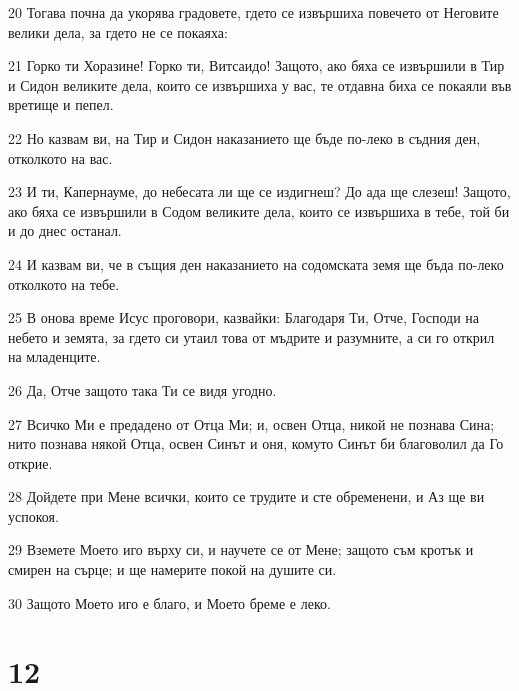 \par 20 Тогава почна да укорява градовете, гдето се извършиха повечето от Неговите велики дела, за гдето не се покаяха:
\par 21 Горко ти Хоразине! Горко ти, Витсаидо! Защото, ако бяха се извършили в Тир и Сидон великите дела, които се извършиха у вас, те отдавна биха се покаяли във вретище и пепел.
\par 22 Но казвам ви, на Тир и Сидон наказанието ще бъде по-леко в съдния ден, отколкото на вас.
\par 23 И ти, Капернауме, до небесата ли ще се издигнеш? До ада ще слезеш! Защото, ако бяха се извършили в Содом великите дела, които се извършиха в тебе, той би и до днес останал.
\par 24 И казвам ви, че в същия ден наказанието на содомската земя ще бъда по-леко отколкото на тебе.
\par 25 В онова време Исус проговори, казвайки: Благодаря Ти, Отче, Господи на небето и земята, за гдето си утаил това от мъдрите и разумните, а си го открил на младенците.
\par 26 Да, Отче защото така Ти се видя угодно.
\par 27 Всичко Ми е предадено от Отца Ми; и, освен Отца, никой не познава Сина; нито познава някой Отца, освен Синът и оня, комуто Синът би благоволил да Го открие.
\par 28 Дойдете при Мене всички, които се трудите и сте обременени, и Аз ще ви успокоя.
\par 29 Вземете Моето иго върху си, и научете се от Мене; защото съм кротък и смирен на сърце; и ще намерите покой на душите си.
\par 30 Защото Моето иго е благо, и Моето бреме е леко.

\chapter{12}

